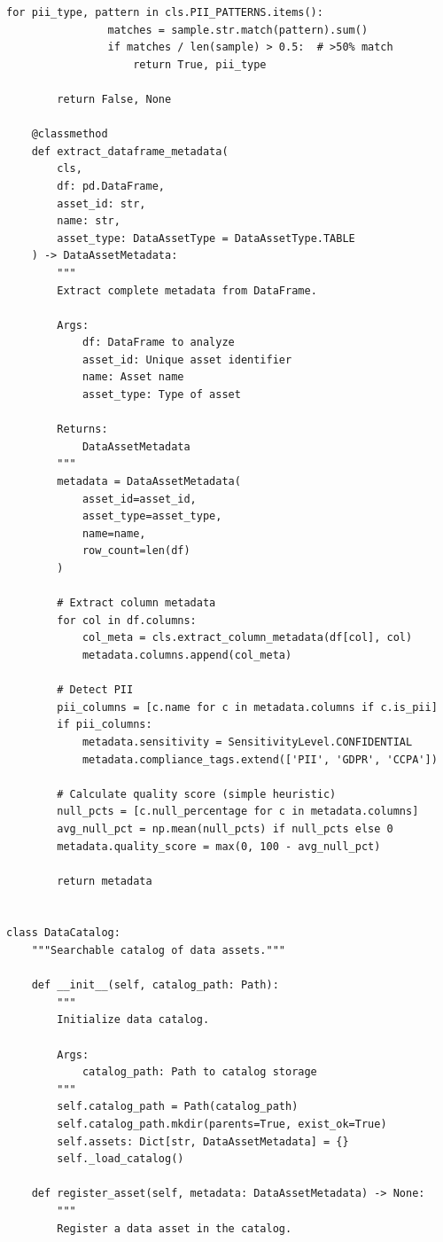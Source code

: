 \begin{lstlisting}[style=python, caption={Enterprise data catalog with automated metadata extraction}]
            for pii_type, pattern in cls.PII_PATTERNS.items():
                matches = sample.str.match(pattern).sum()
                if matches / len(sample) > 0.5:  # >50% match
                    return True, pii_type

        return False, None

    @classmethod
    def extract_dataframe_metadata(
        cls,
        df: pd.DataFrame,
        asset_id: str,
        name: str,
        asset_type: DataAssetType = DataAssetType.TABLE
    ) -> DataAssetMetadata:
        """
        Extract complete metadata from DataFrame.

        Args:
            df: DataFrame to analyze
            asset_id: Unique asset identifier
            name: Asset name
            asset_type: Type of asset

        Returns:
            DataAssetMetadata
        """
        metadata = DataAssetMetadata(
            asset_id=asset_id,
            asset_type=asset_type,
            name=name,
            row_count=len(df)
        )

        # Extract column metadata
        for col in df.columns:
            col_meta = cls.extract_column_metadata(df[col], col)
            metadata.columns.append(col_meta)

        # Detect PII
        pii_columns = [c.name for c in metadata.columns if c.is_pii]
        if pii_columns:
            metadata.sensitivity = SensitivityLevel.CONFIDENTIAL
            metadata.compliance_tags.extend(['PII', 'GDPR', 'CCPA'])

        # Calculate quality score (simple heuristic)
        null_pcts = [c.null_percentage for c in metadata.columns]
        avg_null_pct = np.mean(null_pcts) if null_pcts else 0
        metadata.quality_score = max(0, 100 - avg_null_pct)

        return metadata


class DataCatalog:
    """Searchable catalog of data assets."""

    def __init__(self, catalog_path: Path):
        """
        Initialize data catalog.

        Args:
            catalog_path: Path to catalog storage
        """
        self.catalog_path = Path(catalog_path)
        self.catalog_path.mkdir(parents=True, exist_ok=True)
        self.assets: Dict[str, DataAssetMetadata] = {}
        self._load_catalog()

    def register_asset(self, metadata: DataAssetMetadata) -> None:
        """
        Register a data asset in the catalog.


\end{lstlisting}
